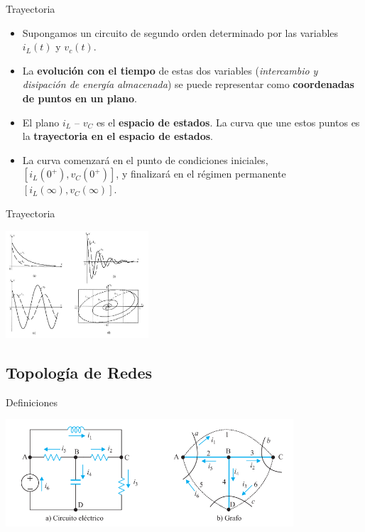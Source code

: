 {Trayectoria}

\begin{itemize}
\item Supongamos un circuito de segundo orden determinado por las variables \(i_L(t)\) y \(v_c(t)\).
\item La \textbf{evolución con el tiempo} de estas dos variables (\emph{intercambio y disipación de energía almacenada}) se puede representar como \textbf{coordenadas de puntos en un plano}.
\item El plano \(i_L\) -- \(v_C\) es el \textbf{espacio de estados}. La curva que une estos puntos es la \textbf{trayectoria en el espacio de estados}.
\item La curva comenzará en el punto de condiciones iniciales, \([i_L(0^+), v_C(0^+)]\), y finalizará en el régimen permanente \([i_L(\infty), v_C(\infty)]\).
\end{itemize}

{Trayectoria}

\begin{center}
\includegraphics[height=4cm]{../figs/trayectoria.pdf}
\end{center}

\subsection{Topología de Redes}
\label{sec:org85a9fe2}

{Definiciones}


\includegraphics[height=4cm]{../figs/grafo.pdf}

